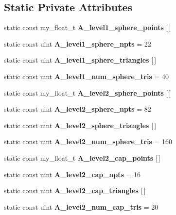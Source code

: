 \subsection*{Static Private Attributes}
\begin{CompactItemize}
\item 
static const my\_\-float\_\-t \textbf{A\_\-level1\_\-sphere\_\-points} [$\,$]
\item 
static const uint \textbf{A\_\-level1\_\-sphere\_\-npts} = 22\label{classSimSite3D_1_1geometry_1_1TriMeshSphere_6c2549e9daacf27c7cf15cb3eb7b7373}

\item 
static const uint \textbf{A\_\-level1\_\-sphere\_\-triangles} [$\,$]\label{classSimSite3D_1_1geometry_1_1TriMeshSphere_278a1d74c086e8ebc40ef05d74b9ea15}

\item 
static const uint \textbf{A\_\-level1\_\-num\_\-sphere\_\-tris} = 40\label{classSimSite3D_1_1geometry_1_1TriMeshSphere_e42055072b403bf91bb04dfe81b8a77c}

\item 
static const my\_\-float\_\-t \textbf{A\_\-level2\_\-sphere\_\-points} [$\,$]\label{classSimSite3D_1_1geometry_1_1TriMeshSphere_9218b68dfd06e39789b926138618dfeb}

\item 
static const uint \textbf{A\_\-level2\_\-sphere\_\-npts} = 82\label{classSimSite3D_1_1geometry_1_1TriMeshSphere_6c493b2654c01b707878f88a76cb12bb}

\item 
static const uint \textbf{A\_\-level2\_\-sphere\_\-triangles} [$\,$]\label{classSimSite3D_1_1geometry_1_1TriMeshSphere_334f79d29df15c86e07a9b2f771436b5}

\item 
static const uint \textbf{A\_\-level2\_\-num\_\-sphere\_\-tris} = 160\label{classSimSite3D_1_1geometry_1_1TriMeshSphere_e8608fc384f66ad810567214a8a65328}

\item 
static const my\_\-float\_\-t \textbf{A\_\-level2\_\-cap\_\-points} [$\,$]
\item 
static const uint \textbf{A\_\-level2\_\-cap\_\-npts} = 16\label{classSimSite3D_1_1geometry_1_1TriMeshSphere_72717de0132dc9de41615e95777e78d1}

\item 
static const uint \textbf{A\_\-level2\_\-cap\_\-triangles} [$\,$]
\item 
static const uint \textbf{A\_\-level2\_\-num\_\-cap\_\-tris} = 20\label{classSimSite3D_1_1geometry_1_1TriMeshSphere_852532701e612513420c5cfcee27edfc}

\end{CompactItemize}


